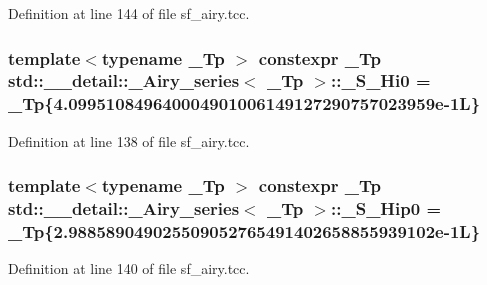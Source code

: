 Definition at line 144 of file sf\+\_\+airy.\+tcc.

\subsubsection[{\texorpdfstring{\+\_\+\+S\+\_\+\+Hi0}{_S_Hi0}}]{\setlength{\rightskip}{0pt plus 5cm}template$<$typename \+\_\+\+Tp $>$ constexpr \+\_\+\+Tp {\bf std\+::\+\_\+\+\_\+detail\+::\+\_\+\+Airy\+\_\+series}$<$ \+\_\+\+Tp $>$\+::\+\_\+\+S\+\_\+\+Hi0 = \+\_\+\+Tp\{4.\+099510849640004901006149127290757023959e-\/1\+L\}\hspace{0.3cm}{\ttfamily [static]}}\hypertarget{classstd_1_1____detail_1_1__Airy__series_a9968426a52459123041f5fc11d73a854}{}\label{classstd_1_1____detail_1_1__Airy__series_a9968426a52459123041f5fc11d73a854}


Definition at line 138 of file sf\+\_\+airy.\+tcc.

\subsubsection[{\texorpdfstring{\+\_\+\+S\+\_\+\+Hip0}{_S_Hip0}}]{\setlength{\rightskip}{0pt plus 5cm}template$<$typename \+\_\+\+Tp $>$ constexpr \+\_\+\+Tp {\bf std\+::\+\_\+\+\_\+detail\+::\+\_\+\+Airy\+\_\+series}$<$ \+\_\+\+Tp $>$\+::\+\_\+\+S\+\_\+\+Hip0 = \+\_\+\+Tp\{2.\+988589049025509052765491402658855939102e-\/1\+L\}\hspace{0.3cm}{\ttfamily [static]}}\hypertarget{classstd_1_1____detail_1_1__Airy__series_a848fb790433db9dc427f9dd37a33da39}{}\label{classstd_1_1____detail_1_1__Airy__series_a848fb790433db9dc427f9dd37a33da39}


Definition at line 140 of file sf\+\_\+airy.\+tcc.

